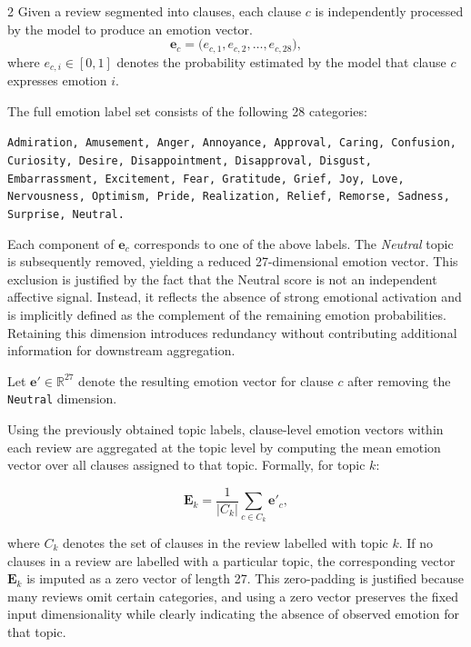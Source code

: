 \documentclass{article}
\begin{document}
\begin{multicols*}{2}
Given a review segmented into clauses, each clause $c$ is independently processed by the model to produce an emotion vector.
\begin{equation}
\mathbf{e}_c = \big(e_{c,1}, e_{c,2}, \ldots, e_{c,28}\big),
\end{equation}
where $e_{c,i} \in [0,1]$ denotes the probability estimated by the model that clause $c$ expresses emotion $i$.

The full emotion label set consists of the following 28 categories:

\noindent\newline
\texttt{Admiration, Amusement, Anger, Annoyance, Approval, Caring, Confusion, Curiosity, Desire, Disappointment, Disapproval, Disgust, \newline Embarrassment, Excitement, Fear, Gratitude, Grief, Joy, Love, Nervousness, Optimism, Pride, Realization, Relief, Remorse, Sadness, Surprise, Neutral.}
\newline

Each component of $\mathbf{e}_c$ corresponds to one of the above labels. The \textit{Neutral} topic is subsequently removed, yielding a reduced 27-dimensional emotion vector. This exclusion is justified by the fact that the Neutral score is not an independent affective signal. Instead, it reflects the absence of strong emotional activation and is implicitly defined as the complement of the remaining emotion probabilities. Retaining this dimension introduces redundancy without contributing additional information for downstream aggregation.

Let $\mathbf{e}'\in \mathbb{R}^{27}$ denote the resulting emotion vector for clause $c$ after removing the \texttt{Neutral} dimension.

Using the previously obtained topic labels, clause-level emotion vectors within each review are aggregated at the topic level by computing the mean emotion vector over all clauses assigned to that topic. Formally, for topic $k$:

\begin{equation}
\mathbf{E}_k = \frac{1}{|C_k|} \sum_{c \in C_k} \mathbf{e}'_c,
\end{equation}

where $C_k$ denotes the set of clauses in the review labelled with topic $k$. If no clauses in a review are labelled with a particular topic, the corresponding vector $\mathbf{E}_k$ is imputed as a zero vector of length 27. This zero-padding is justified because many reviews omit certain categories, and using a zero vector preserves the fixed input dimensionality while clearly indicating the absence of observed emotion for that topic.


\end{multicols*}
\end{document}
